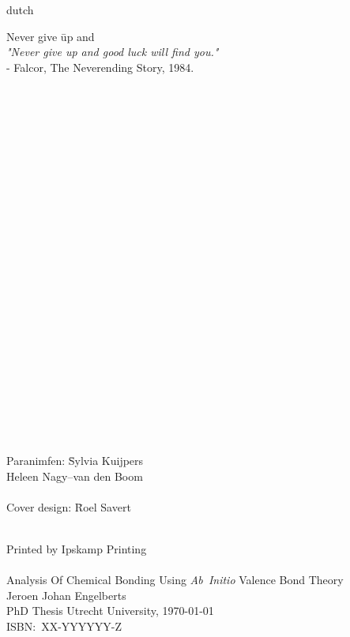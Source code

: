 \begin{otherlanguage*}{dutch}
\newpage
\raggedright
\noindent
\begin{tabbing}
Never give \= up and \kill\\
\textit{"Never give up and good luck will find you."}\\
\> - Falcor, The Neverending Story, 1984.
\end{tabbing}
\mbox{ }\\
\mbox{ }\\
\mbox{ }\\
\mbox{ }\\
\mbox{ }\\
\mbox{ }\\
\mbox{ }\\
\mbox{ }\\
\mbox{ }\\
\mbox{ }\\
\mbox{ }\\
\mbox{ }\\
\mbox{ }\\
\mbox{ }\\
\mbox{ }\\
\mbox{ }\\
\mbox{ }\\
\mbox{ }\\
\mbox{ }\\
\mbox{ }\\
\mbox{ }\\
\mbox{ }\\
\mbox{ }\\
\begin{tabbing}
Paranimfen: \=Sylvia Kuijpers\\
            \>Heleen Nagy--van den Boom\\
\\
Cover design: \=Roel Savert\\
\end{tabbing}
\end{otherlanguage*}
\mbox{ }\\
Printed by Ipskamp Printing\\
\mbox{ }\\
Analysis Of Chemical Bonding Using \textit{Ab~Initio} Valence Bond Theory\\
Jeroen Johan Engelberts\\
PhD Thesis Utrecht University, \today \\
ISBN:~XX-YYYYYY-Z
\newpage

\tableofcontents

\mainmatter \pagestyle{fancy}

